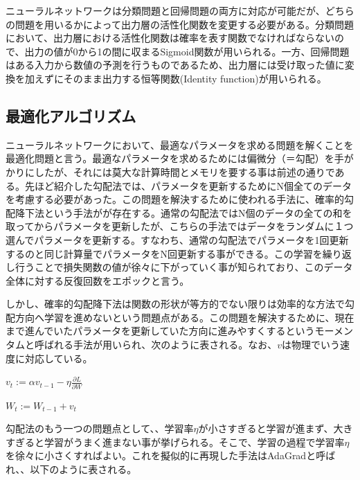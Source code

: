 \documentclass{article}
\begin{document}
ニューラルネットワークは分類問題と回帰問題の両方に対応が可能だが、どちらの問題を用いるかによって出力層の活性化関数を変更する必要がある。分類問題において、出力層における活性化関数は確率を表す関数でなければならないので、出力の値が0から1の間に収まるSigmoid関数が用いられる。一方、回帰問題はある入力から数値の予測を行うものであるため、出力層には受け取った値に変換を加えずにそのまま出力する恒等関数(Identity function)が用いられる。


\subsection{最適化アルゴリズム}

ニューラルネットワークにおいて、最適なパラメータを求める問題を解くことを最適化問題と言う。最適なパラメータを求めるためには偏微分（＝勾配）を手がかりにしたが、それには莫大な計算時間とメモリを要する事は前述の通りである。先ほど紹介した勾配法では、パラメータを更新するためにN個全てのデータを考慮する必要があった。この問題を解決するために使われる手法に、確率的勾配降下法という手法がが存在する。通常の勾配法ではN個のデータの全ての和を取ってからパラメータを更新したが、こちらの手法ではデータをランダムに１つ選んでパラメータを更新する。すなわち、通常の勾配法でパラメータを1回更新するのと同じ計算量でパラメータをN回更新する事ができる。この学習を繰り返し行うことで損失関数の値が徐々に下がっていく事が知られており、このデータ全体に対する反復回数をエポックと言う。

しかし、確率的勾配降下法は関数の形状が等方的でない限りは効率的な方法で勾配方向へ学習を進めないという問題点がある。この問題を解決するために、現在まで進んでいたパラメータを更新していた方向に進みやすくするというモーメンタムと呼ばれる手法が用いられ、次のように表される。なお、\begin{math}v\end{math}は物理でいう速度に対応している。


\begin{center}
\begin{math}
v_t := \alpha v_{t-1} - \eta  \frac{\partial L}{\partial W}
\end{math}
\end{center}

\begin{center}
\begin{math}
W_t := W_{t-1} + v_t
\end{math}
\end{center}


勾配法のもう一つの問題点として、、学習率\begin{math}\eta\end{math}が小さすぎると学習が進まず、大きすぎると学習がうまく進まない事が挙げられる。そこで、学習の過程で学習率\begin{math}\eta\end{math}を徐々に小さくすればよい。これを擬似的に再現した手法はAdaGradと呼ばれ、、以下のように表される。
\end{document}
